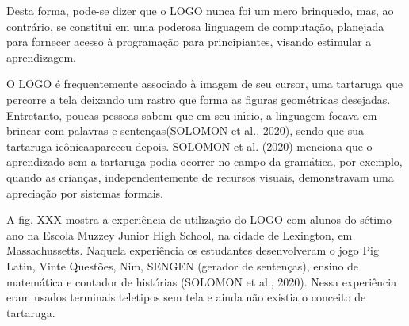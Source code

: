 \documentclass[
12pt,		%
openright,	%
twoside,  %
a4paper,			%
chapter=TITLE,		%
english,			%
french,				%
spanish,			%
brazil				%
]{USPSC-classe/USPSC}
\begin{document}
Desta forma, pode-se dizer que o LOGO nunca foi um mero brinquedo, mas, ao contr\'ario, se constitui em uma poderosa linguagem de computa\c{c}\~ao, planejada para fornecer acesso \`a programa\c{c}\~ao para principiantes, visando estimular a aprendizagem.

















O LOGO \'e frequentemente associado \`a imagem de seu cursor, uma tartaruga que percorre a tela deixando um rastro que forma as figuras geom\'etricas desejadas. Entretanto, poucas pessoas sabem que em seu in\'{\i}cio, a linguagem \textquotedbl focava em brincar com palavras e senten\c{c}as\textquotedbl  (SOLOMON et al., 2020), sendo que sua tartaruga \textquotedbl ic\^onica\textquotedbl  apareceu depois.  SOLOMON et al. (2020) menciona que o aprendizado sem a tartaruga podia ocorrer no campo da gram\'atica, por exemplo, quando as crian\c{c}as, independentemente de recursos visuais, demonstravam uma aprecia\c{c}\~ao por sistemas formais.

















A fig. XXX mostra a experi\^encia de utiliza\c{c}\~ao do LOGO com alunos do s\'etimo ano na Escola Muzzey Junior High School, na cidade de Lexington, em Massachussetts. Naquela experi\^encia os estudantes desenvolveram o jogo Pig Latin, Vinte Quest\~oes, Nim, SENGEN (gerador de senten\c{c}as), ensino de matem\'atica e contador de hist\'orias  (SOLOMON et al., 2020). Nessa experi\^encia eram usados terminais teletipos sem tela e ainda n\~ao existia o conceito de tartaruga.
\end{document}

